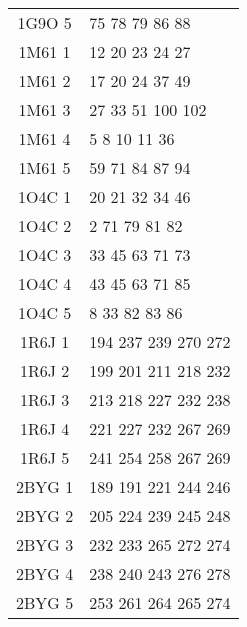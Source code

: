 \begin{table}[!htbp]
\begin{tabular}{cl}
      1G9O 5 & 75 78 79 86 88 \\
      1M61 1 & 12 20 23 24 27 \\
      1M61 2 & 17 20 24 37 49 \\
      1M61 3 & 27 33 51 100 102 \\
      1M61 4 & 5 8 10 11 36 \\
      1M61 5 & 59 71 84 87 94 \\
      1O4C 1 & 20 21 32 34 46 \\
      1O4C 2 & 2 71 79 81 82 \\
      1O4C 3 & 33 45 63 71 73 \\
      1O4C 4 & 43 45 63 71 85 \\
      1O4C 5 & 8 33 82 83 86 \\
      1R6J 1 & 194 237 239 270 272 \\
      1R6J 2 & 199 201 211 218 232 \\
      1R6J 3 & 213 218 227 232 238 \\
      1R6J 4 & 221 227 232 267 269 \\
      1R6J 5 & 241 254 258 267 269 \\
      2BYG 1 & 189 191 221 244 246 \\
      2BYG 2 & 205 224 239 245 248 \\
      2BYG 3 & 232 233 265 272 274 \\
      2BYG 4 & 238 240 243 276 278 \\
      2BYG 5 & 253 261 264 265 274 \\
      
      \bottomrule
    \end{tabular}      
  \label{tab:select5}      
\end{table}


